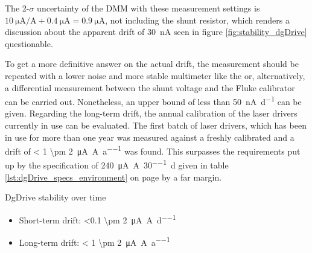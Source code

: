 The 2-$\sigma$ uncertainty of the  DMM \cite{datasheet_keysight34470A} with these measurement settings is $\qty{10}{\uA \per \A} + \qty{0.4}{\uA} = \qty{0.9}{\uA}$, not including the shunt resistor, which renders a discussion about the apparent drift of \qty{30}{\nA} seen in figure \ref{fig:stability_dgDrive} questionable.

To get a more definitive answer on the actual drift, the measurement should be repeated with a lower noise and more stable multimeter like the  or, alternatively, a differential measurement between the shunt voltage and the Fluke  calibrator can be carried out. Nonetheless, an upper bound of less than \qty{50}{\nA \per \day} can be given. Regarding the long-term drift, the annual calibration of the laser drivers currently in use can be evaluated. The first batch of laser drivers, which has been in use for more than one year was measured against a freshly calibrated  and a drift of \qty{< 1 \pm 2}{\uA \per \A \per a} was found. This surpasses the requirements put up by the specification of \qty{240}{\uA \per \A \per 30 \day} given in table \ref{lst:dgDrive_specs_environment} on page \pageref{lst:dgDrive_specs_environment} by a far margin.
\begin{center}
    \begin{deviceProperties}[label={lst:dgDrive_temporal_stability}]{DgDrive stability over time}
    \begin{itemize}
        \item Short-term drift: \qty[per-mode = symbol]{<0.1 \pm 2}{\uA \per \A \per \day}
        \item Long-term drift: \qty[per-mode = symbol]{< 1 \pm 2}{\uA \per \A \per a}
    \end{itemize}
    \end{deviceProperties}
\end{center}

